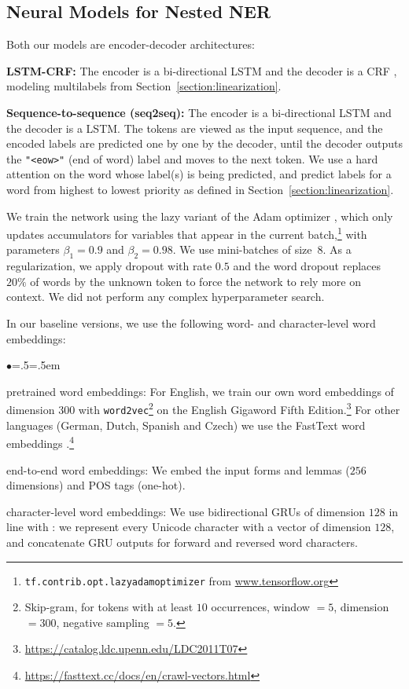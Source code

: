 \documentclass[11pt,a4paper]{article}
\newenvironment{citemize}{\begin{list}{$\bullet$}{\topsep=.5\smallskipamount\itemsep=0pt\parsep=1pt\labelwidth=.5em}}{\end{list}}
\begin{document}
\subsection{Neural Models for Nested NER}

Both our models are encoder-decoder architectures:

\textbf{LSTM-CRF:} The encoder is a bi-directional LSTM and the decoder is a CRF \cite{Lample2016},
modeling multilabels from Section~\ref{section:linearization}.

\textbf{Sequence-to-sequence (seq2seq):} The encoder is a bi-directional LSTM
and the decoder is a LSTM. The tokens are viewed as the input sequence, and the
encoded labels are predicted one by one by the decoder, until the decoder
outputs the \texttt{"<eow>"} (end of word) label and moves to the next token. We use
a hard attention on the word whose label(s) is being predicted, and predict labels for a word from highest to lowest priority as defined in Section~\ref{section:linearization}.

We train the network using the lazy variant of the Adam optimizer \cite{Adam}, which only updates accumulators for variables that appear in the current
batch,\footnote{\texttt{tf.contrib.opt.lazyadamoptimizer} from
\url{www.tensorflow.org}} with parameters $\beta_1=0.9$ and $\beta_2=0.98$. We
use mini-batches of size~$8$. As a regularization, we apply dropout with rate
$0.5$ and the word dropout replaces $20\%$ of words by the unknown token to
force the network to rely more on context. We did not perform any complex
hyperparameter search.

In our baseline versions, we use the following word- and character-level word
embeddings:

\begin{citemize}
  \item pretrained word embeddings: For English, we train our own word
    embeddings of dimension $300$ with \texttt{word2vec}\footnote{Skip-gram,
    for tokens with at least $10$ occurrences, window $=5$, dimension $=300$,
    negative sampling $=5$.} on the English Gigaword Fifth
    Edition.\footnote{\url{https://catalog.ldc.upenn.edu/LDC2011T07}} For other
    languages (German, Dutch, Spanish and Czech) we use the FastText word
    embeddings \cite{FastText}.\footnote{\url{https://fasttext.cc/docs/en/crawl-vectors.html}}
  \item end-to-end word embeddings: We embed the input forms and lemmas ($256$ dimensions) and POS tags (one-hot).
  \item character-level word embeddings: We use bidirectional GRUs
    \cite{Cho2014,Graves2005} of dimension $128$ in line with \citet{Ling2015}: we represent every
    Unicode character with a vector of dimension $128$, and concatenate
    GRU outputs for forward and reversed word characters.
\end{citemize}
\end{document}
